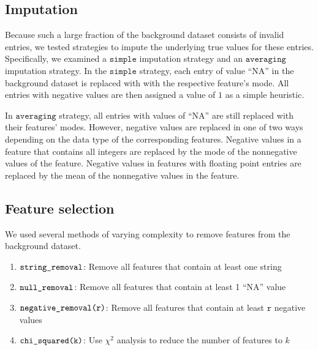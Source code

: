 \documentclass{article} %
\begin{document}
\subsection{Imputation}
\label{sec:imputation}

Because such a large fraction of the background dataset consists of invalid entries, we tested strategies to impute the underlying true values for these entries. Specifically, we examined a $\texttt{simple}$ imputation strategy and an $\texttt{averaging}$ imputation strategy. In the $\texttt{simple}$ strategy, each entry of value ``NA'' in the background dataset is replaced with with the respective feature's mode. All entries with negative values are then assigned a value of $1$ as a simple heuristic.

In $\texttt{averaging}$ strategy, all entries with values of ``NA'' are still replaced with their features' modes. However, negative values are replaced in one of two ways depending on the data type of the corresponding features. Negative values in a feature that contains all integers are replaced by the mode of the nonnegative values of the feature. Negative values in features with floating point entries are replaced by the mean of the nonnegative values in the feature.

\subsection{Feature selection}
\label{sec:featureselection}

We used several methods of varying complexity to remove features from the background dataset.

\begin{enumerate}
  \item $\texttt{string\textunderscore removal}$: Remove all features that contain at least one string
  \item $\texttt{null\textunderscore removal}$: Remove all features that contain at least 1 ``NA'' value
  \item $\texttt{negative\textunderscore removal(r)}$: Remove all features that contain at least $\texttt{r}$ negative values
  \item $\texttt{chi\textunderscore squared(k)}$: Use $\chi^2$ analysis to reduce the number of features to $k$
\end{enumerate}

\end{document}
